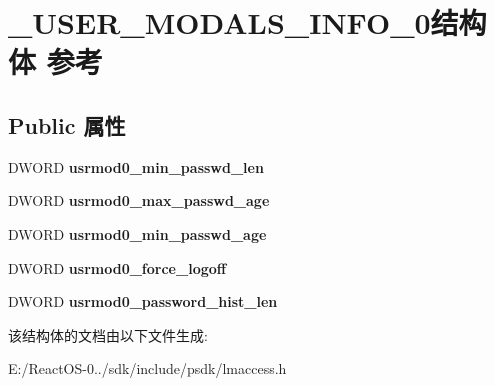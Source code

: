 \hypertarget{struct___u_s_e_r___m_o_d_a_l_s___i_n_f_o__0}{}\section{\+\_\+\+U\+S\+E\+R\+\_\+\+M\+O\+D\+A\+L\+S\+\_\+\+I\+N\+F\+O\+\_\+0结构体 参考}
\label{struct___u_s_e_r___m_o_d_a_l_s___i_n_f_o__0}
\subsection*{Public 属性}
\begin{DoxyCompactItemize}
\item 
\mbox{\label{struct___u_s_e_r___m_o_d_a_l_s___i_n_f_o__0_abf69b2ff6e1a60aac150a5605902db8e}} 
D\+W\+O\+RD {\bfseries usrmod0\+\_\+min\+\_\+passwd\+\_\+len}
\item 
\mbox{\label{struct___u_s_e_r___m_o_d_a_l_s___i_n_f_o__0_ace6dfe7ef2f95c814e854553aebc5157}} 
D\+W\+O\+RD {\bfseries usrmod0\+\_\+max\+\_\+passwd\+\_\+age}
\item 
\mbox{\label{struct___u_s_e_r___m_o_d_a_l_s___i_n_f_o__0_a1479097e2a923044e962cdcac791280e}} 
D\+W\+O\+RD {\bfseries usrmod0\+\_\+min\+\_\+passwd\+\_\+age}
\item 
\mbox{\label{struct___u_s_e_r___m_o_d_a_l_s___i_n_f_o__0_abd7c844a56dcda14a9ad3ed0faad5137}} 
D\+W\+O\+RD {\bfseries usrmod0\+\_\+force\+\_\+logoff}
\item 
\mbox{\label{struct___u_s_e_r___m_o_d_a_l_s___i_n_f_o__0_ad01dba2d4f15eabe3ab33b770eaf07b9}} 
D\+W\+O\+RD {\bfseries usrmod0\+\_\+password\+\_\+hist\+\_\+len}
\end{DoxyCompactItemize}


该结构体的文档由以下文件生成\+:\begin{DoxyCompactItemize}
\item 
E\+:/\+React\+O\+S-\/0../sdk/include/psdk/lmaccess.\+h\end{DoxyCompactItemize}
